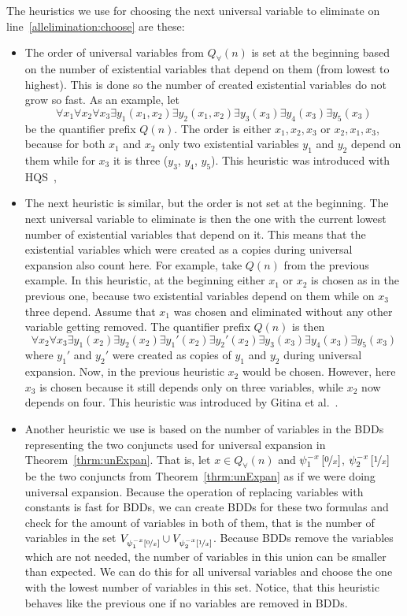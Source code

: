 \documentclass[
  digital, %
  color,
  twoside, %
  table,   %
  nolof,     %
  nolot,     %
]{fithesis3}
\theoremstyle{definition}
\theoremstyle{remark}
\newcommand{\substitute}[2]{\left[ \nicefrac{#2}{#1} \right]}
\newcommand{\vars}[1]{V_{#1}}
\newcommand{\prefix}[1]{Q({#1})}
\newcommand{\uprefix}[1]{Q_{\forall}(#1)}
\begin{document}
The heuristics we use for choosing the next universal variable to eliminate on line~\ref{allelimination:choose} are these:
\begin{itemize}
    \item The order of universal variables from $\uprefix{n}$ is set at the beginning based on the number of existential variables that depend on them (from lowest to highest). This is done so the number of created existential variables do not grow so fast. %
    As an example, let
    \[\forall x_1 \forall x_2 \forall x_3 \exists y_1(x_1, x_2) \exists y_2(x_1,x_2) \exists y_3(x_3) \exists y_4(x_3) \exists y_5 (x_3)\]
    be the quantifier prefix $\prefix{n}$. The order is either $x_1, x_2, x_3$ or $x_2, x_1, x_3$, because for both $x_1$ and $x_2$ only two existential variables $y_1$ and $y_2$ depend on them while for $x_3$ it is three ($y_3$, $y_4$, $y_5$). This heuristic was introduced with HQS~\cite{HQSquantifierElimination}, 
    \item The next heuristic is similar, but the order is not set at the beginning. The next universal variable to eliminate is then the one with the current lowest number of existential variables that depend on it. This means that the existential variables which were created as a copies during universal expansion also count here. For example, take $\prefix{n}$ from the previous example. In this heuristic, at the beginning either $x_1$ or $x_2$ is chosen as in the previous one, because two existential variables depend on them while on $x_3$ three depend. Assume that $x_1$ was chosen and eliminated without any other variable getting removed. The quantifier prefix $\prefix{n}$ is then
    \[\forall x_2 \forall x_3 \exists y_1(x_2) \exists y_2(x_2) \exists y_1'(x_2) \exists y_2'(x_2) \exists y_3(x_3) \exists y_4(x_3) \exists y_5 (x_3)\]
    where $y_1'$ and $y_2'$ were created as copies of $y_1$ and $y_2$ during universal expansion. Now, in the previous heuristic $x_2$ would be chosen. However, here $x_3$ is chosen because it still depends only on three variables, while $x_2$ now depends on four. This heuristic was introduced by Gitina et al.~\cite{HQSsimpleAlg}.
    \item Another heuristic we use is based on the number of variables in the BDDs representing the two conjuncts used for universal expansion in Theorem~\ref{thrm:unExpan}. That is, let $x \in \uprefix{n}$ and $\psi_1^{-x}\substitute{x}{0}$, $\psi_2^{-x}\substitute{x}{1}$
    be the two conjuncts from Theorem~\ref{thrm:unExpan} as if we were doing universal expansion. Because the operation of replacing variables with constants is fast for BDDs, we can create BDDs for these two formulas and check for the amount of variables in both of them, that is the number of variables in the set $\vars{\psi_1^{-x}\substitute{x}{0}} \cup \vars{\psi_2^{-x}\substitute{x}{1}}$. Because BDDs remove the variables which are not needed, the number of variables in this union can be smaller than expected. We can do this for all universal variables and choose the one with the lowest number of variables in this set. Notice, that this heuristic behaves like the previous one if no variables are removed in BDDs.

\end{itemize}
\end{document}
